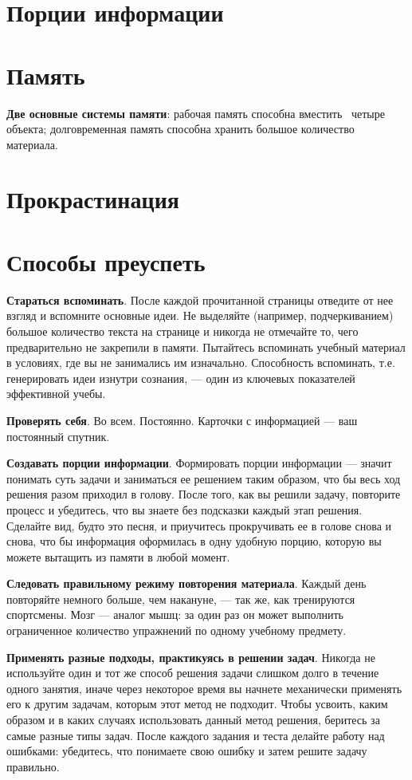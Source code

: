 \documentclass{article}
\begin{document}
\section{Порции информации}
\section{Память}
\textbf{Две основные системы памяти}: рабочая память способна вместить ~четыре объекта; долговременная память способна хранить большое количество материала.
\medskip

\section{Прокрастинация}
\section{Способы преуспеть}
\textbf{Стараться вспоминать}. После каждой прочитанной страницы отведите от нее взгляд и вспомните основные идеи. Не выделяйте (например, подчеркиванием) большое количество текста на странице и никогда не отмечайте то, чего предварительно не закрепили в памяти. Пытайтесь вспоминать учебный материал в условиях, где вы не занимались им изначально. Способность вспоминать, т.е. генерировать идеи изнутри сознания, --- один из ключевых показателей эффективной учебы.
\smallskip

\textbf{Проверять себя}. Во всем. Постоянно. Карточки с информацией --- ваш постоянный спутник.
\smallskip

\textbf{Создавать порции информации}. Формировать порции информации --- значит понимать суть задачи и заниматься ее решением таким образом, что бы весь ход решения разом приходил в голову. После того, как вы решили задачу, повторите процесс и убедитесь, что вы знаете без подсказки каждый этап решения. Сделайте вид, будто это песня, и приучитесь прокручивать ее в голове снова и снова, что бы информация оформилась в одну удобную порцию, которую вы можете вытащить из памяти в любой момент.
\smallskip

\textbf{Следовать правильному режиму повторения материала}. Каждый день повторяйте немного больше, чем накануне, --- так же, как тренируются спортсмены. Мозг --- аналог мышц: за один раз он может выполнить ограниченное количество упражнений по одному учебному предмету.
\smallskip

\textbf{Применять разные подходы, практикуясь в решении задач}. Никогда не используйте один и тот же способ решения задачи слишком долго в течение одного занятия, иначе через некоторое время вы начнете механически применять его к другим задачам, которым этот метод не подходит. Чтобы усвоить, каким образом и в каких случаях использовать данный метод решения, беритесь за самые разные типы задач. После каждого задания и теста делайте работу над ошибками: убедитесь, что понимаете свою ошибку и затем решите задачу правильно.
\smallskip
\end{document}
